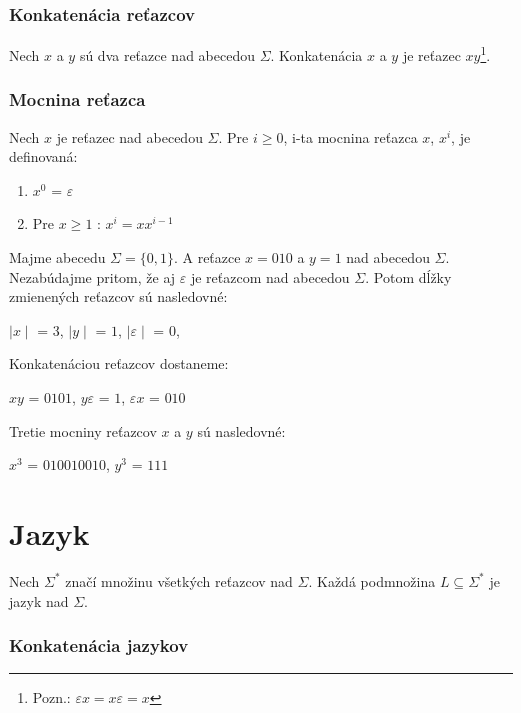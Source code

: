 \subsubsection{Konkatenácia reťazcov}

Nech $x$ a $y$ sú dva reťazce nad abecedou $\Sigma$. Konkatenácia $x$ a $y$ je reťazec $xy$\footnote{Pozn.: $\varepsilon$$x = x\varepsilon = x$}.

\subsubsection{Mocnina reťazca}

Nech $x$ je reťazec nad abecedou $\Sigma$. Pre $i\geq0$, i-ta mocnina reťazca $x$, $x^i$, je definovaná:
\begin{enumerate}
\item $x^0$ = $\varepsilon$
\item Pre $x\geq1$ : $x^i = xx^{i-1}$
\end{enumerate}


\begin{theorem}
\normalfont Majme abecedu $\Sigma = \{0, 1\}$. A reťazce $x = 010$ a $y = 1$ nad abecedou $\Sigma$. Nezabúdajme pritom, že aj $\varepsilon$ je reťazcom nad abecedou $\Sigma$. Potom dĺžky zmienených reťazcov sú nasledovné:
\begin{center}
$\mid x \mid$ = $3$,
$\mid y \mid$ = $1$,
$\mid\varepsilon\mid$ = $0$,
\end{center} 

Konkatenáciou reťazcov dostaneme:
\begin{center}
$xy$ = $0101$, $y\varepsilon$ = $1$, $\varepsilon x$ = $010$
\end{center} 

Tretie mocniny reťazcov $x$ a $y$ sú nasledovné:
\begin{center}
$x^3$ = $010010010$, $y^3$ = $111$
\end{center} 
\end{theorem}


\section{Jazyk}

Nech $\Sigma^\ast$ značí množinu všetkých reťazcov nad $\Sigma$. Každá podmnožina $L \subseteq \Sigma^\ast$ je jazyk nad $\Sigma$.

\subsubsection{Konkatenácia jazykov}


